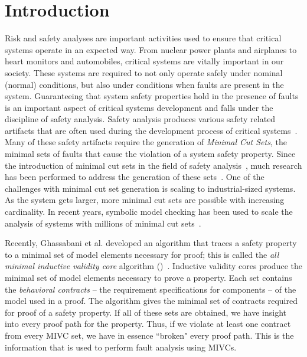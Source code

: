 \section{Introduction}
\label{sec:intro}

Risk and safety analyses are important activities used to ensure that critical systems operate in an expected way. From nuclear power plants and airplanes to heart monitors and automobiles, critical systems are vitally important in our society. These systems are required to not only operate safely under nominal (normal) conditions, but also under conditions when faults are present in the system. Guaranteeing that system safety properties hold in the presence of faults is an important aspect of critical systems development and falls under the discipline of safety analysis. Safety analysis produces various safety related artifacts that are often used during the development process of critical systems~\cite{SAE:ARP4761,SAE:ARP4754A}. Many of these safety artifacts require the generation of \textit{Minimal Cut Sets}, the minimal sets of faults that cause the violation of a system safety property. Since the introduction of minimal cut sets in the field of safety analysis~\cite{vesely1981fault}, much research has been performed to address the generation of these sets~\cite{fta:survey,rauzy1993new,historyFTA,Bozzano:2010:DSA:1951720,rausand2003system}. One of the challenges with minimal cut set generation is scaling to industrial-sized systems. As the system gets larger, more minimal cut sets are possible with increasing cardinality. In recent years, symbolic model checking has been used to scale the analysis of systems with millions of minimal cut sets~\cite{bieber2002combination,schafer2003combining,fta:survey,contractBasedDesign,symbFTA,DBLP:conf/cav/BozzanoCPJKPRT15}. 

Recently, Ghassabani et al. developed an algorithm that traces a safety property to a minimal set of model elements necessary for proof; this is called the \textit{all minimal inductive validity core} algorithm (\aivcalg)~\cite{GhassabaniGW16,Ghassabani2017EfficientGO,bendik2018online}. Inductive validity cores produce the minimal set of model elements necessary to prove a property. Each set contains the \emph{behavioral contracts} -- the requirement specifications for components -- of the model used in a proof. The \aivcalg algorithm gives the minimal set of contracts required for proof of a safety property. If all of these sets are obtained, we have insight into every proof path for the property. Thus, if we violate at least one contract from every MIVC set, we have in essence ``broken" every proof path. This is the information that is used to perform fault analysis using MIVCs.

